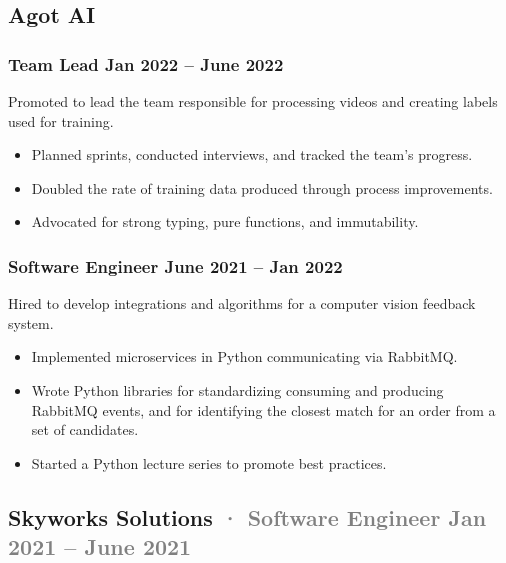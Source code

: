 \documentclass[12pt]{article} %
\providecommand{\tightlist}{%
  \setlength{\itemsep}{0pt}\setlength{\parskip}{0pt}}
\renewcommand{\emph}[1]{%
  \textcolor{gray}{#1}%
}
\begin{document}
\hypertarget{agot-ai}{%
\subsection{Agot AI}\label{agot-ai}}

\vspace{-5pt}

\hypertarget{team-lead-jan-2022-june-2022}{%
\subsubsection{\texorpdfstring{\small Team Lead \hfill Jan 2022 -- June
2022}{Team Lead Jan 2022 -- June 2022}}\label{team-lead-jan-2022-june-2022}}

Promoted to lead the team responsible for processing videos and creating
labels used for training.

\begin{itemize}
\tightlist
\item
  Planned sprints, conducted interviews, and tracked the team's
  progress.
\item
  Doubled the rate of training data produced through process
  improvements.
\item
  Advocated for strong typing, pure functions, and immutability.
\end{itemize}

\hypertarget{software-engineer-june-2021-jan-2022}{%
\subsubsection{\texorpdfstring{\small Software Engineer \hfill June 2021
-- Jan
2022}{Software Engineer June 2021 -- Jan 2022}}\label{software-engineer-june-2021-jan-2022}}

Hired to develop integrations and algorithms for a computer vision
feedback system.

\begin{itemize}
\tightlist
\item
  Implemented microservices in Python communicating via RabbitMQ.
\item
  Wrote Python libraries for standardizing consuming and producing
  RabbitMQ events, and for identifying the closest match for an order
  from a set of candidates.
\item
  Started a Python lecture series to promote best practices.
\end{itemize}

\hypertarget{skyworks-solutions-software-engineer-jan-2021-june-2021}{%
\subsection{\texorpdfstring{Skyworks Solutions \emph{· \small Software
Engineer \hfill Jan 2021 -- June
2021}}{Skyworks Solutions · Software Engineer Jan 2021 -- June 2021}}\label{skyworks-solutions-software-engineer-jan-2021-june-2021}}
\end{document}
